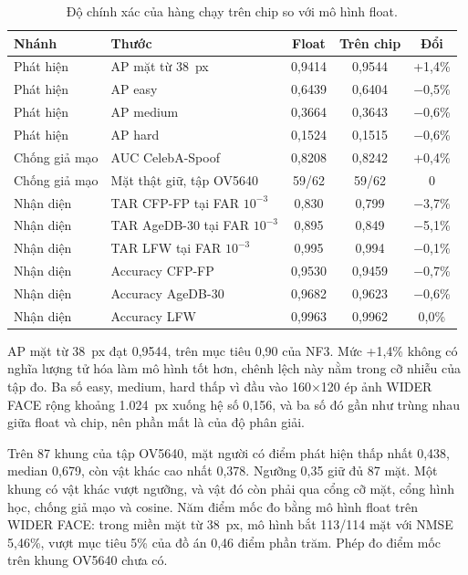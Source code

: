 \documentclass[../DoAn.tex]{subfiles}
\begin{document}
\begin{table}[!htb]
\centering
\small
\caption{Độ chính xác của hàng chạy trên chip so với mô hình float.}
\label{tab:chinh_xac}
\begin{tabular}{|L{2.7cm}|L{5.3cm}|c|c|c|}
\hline
\textbf{Nhánh} & \textbf{Thước} & \textbf{Float} & \textbf{Trên chip} & \textbf{Đổi} \\
\hline
Phát hiện & AP mặt từ 38~px & 0,9414 & 0,9544 & +1,4\% \\
\hline
Phát hiện & AP easy & 0,6439 & 0,6404 & $-$0,5\% \\
\hline
Phát hiện & AP medium & 0,3664 & 0,3643 & $-$0,6\% \\
\hline
Phát hiện & AP hard & 0,1524 & 0,1515 & $-$0,6\% \\
\hline
Chống giả mạo & AUC CelebA-Spoof & 0,8208 & 0,8242 & +0,4\% \\
\hline
Chống giả mạo & Mặt thật giữ, tập OV5640 & 59/62 & 59/62 & 0 \\
\hline
Nhận diện & TAR CFP-FP tại FAR $10^{-3}$ & 0,830 & 0,799 & $-$3,7\% \\
\hline
Nhận diện & TAR AgeDB-30 tại FAR $10^{-3}$ & 0,895 & 0,849 & $-$5,1\% \\
\hline
Nhận diện & TAR LFW tại FAR $10^{-3}$ & 0,995 & 0,994 & $-$0,1\% \\
\hline
Nhận diện & Accuracy CFP-FP & 0,9530 & 0,9459 & $-$0,7\% \\
\hline
Nhận diện & Accuracy AgeDB-30 & 0,9682 & 0,9623 & $-$0,6\% \\
\hline
Nhận diện & Accuracy LFW & 0,9963 & 0,9962 & 0,0\% \\
\hline
\end{tabular}
\end{table}

AP mặt từ 38~px đạt 0,9544, trên mục tiêu 0,90 của NF3. Mức +1,4\% không có nghĩa lượng tử hóa làm mô hình tốt hơn, chênh lệch này
nằm trong cỡ nhiễu của tập đo. Ba số easy, medium, hard thấp vì đầu vào 160$\times$120 ép ảnh WIDER FACE rộng khoảng 1.024~px xuống
hệ số 0,156, và ba số đó gần như trùng nhau giữa float và chip, nên phần mất là của độ phân giải.

Trên 87 khung của tập OV5640, mặt người có điểm phát hiện thấp nhất 0,438, median 0,679, còn vật khác cao nhất 0,378. Ngưỡng 0,35 giữ
đủ 87 mặt. Một khung có vật khác vượt ngưỡng, và vật đó còn phải qua cổng cỡ mặt, cổng hình học, chống giả mạo và cosine. Năm điểm
mốc đo bằng mô hình float trên WIDER FACE: trong miền mặt từ 38~px, mô hình bắt 113/114 mặt với NMSE 5,46\%, vượt mục tiêu 5\% của
đồ án 0,46 điểm phần trăm. Phép đo điểm mốc trên khung OV5640 chưa có.
\end{document}
